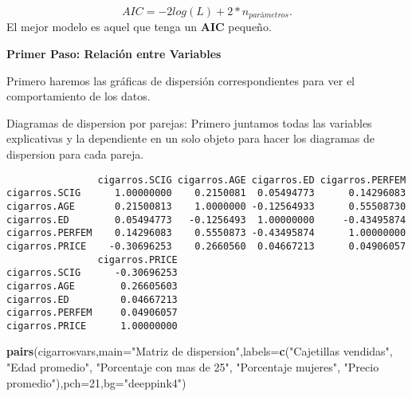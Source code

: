 \documentclass[
  a4paper,
  oneside,
  openany]{book}
\newenvironment{Shaded}{\begin{snugshade}}{\end{snugshade}}
\newcommand{\AttributeTok}[1]{\textcolor[rgb]{0.13,0.29,0.53}{#1}}
\newcommand{\DecValTok}[1]{\textcolor[rgb]{0.00,0.00,0.81}{#1}}
\newcommand{\FunctionTok}[1]{\textcolor[rgb]{0.13,0.29,0.53}{\textbf{#1}}}
\newcommand{\NormalTok}[1]{#1}
\newcommand{\OtherTok}[1]{\textcolor[rgb]{0.56,0.35,0.01}{#1}}
\newcommand{\SpecialCharTok}[1]{\textcolor[rgb]{0.81,0.36,0.00}{\textbf{#1}}}
\newcommand{\StringTok}[1]{\textcolor[rgb]{0.31,0.60,0.02}{#1}}
\begin{document}
\[AIC=-2log(L) +2* n_{parámetros}.\]
El mejor modelo es aquel que tenga un \(\textbf{AIC}\) pequeño.

\textbf{Primer Paso: Relación entre Variables}

Primero haremos las gráficas de dispersión correspondientes para ver el comportamiento de los datos.

Diagramas de dispersion por parejas: Primero juntamos todas las variables explicativas y la dependiente en un solo objeto para hacer los diagramas de dispersion para cada pareja.

\begin{Shaded}
\end{Shaded}

\begin{verbatim}
                cigarros.SCIG cigarros.AGE cigarros.ED cigarros.PERFEM
cigarros.SCIG      1.00000000    0.2150081  0.05494773      0.14296083
cigarros.AGE       0.21500813    1.0000000 -0.12564933      0.55508730
cigarros.ED        0.05494773   -0.1256493  1.00000000     -0.43495874
cigarros.PERFEM    0.14296083    0.5550873 -0.43495874      1.00000000
cigarros.PRICE    -0.30696253    0.2660560  0.04667213      0.04906057
                cigarros.PRICE
cigarros.SCIG      -0.30696253
cigarros.AGE        0.26605603
cigarros.ED         0.04667213
cigarros.PERFEM     0.04906057
cigarros.PRICE      1.00000000
\end{verbatim}

\begin{Shaded}
\begin{Highlighting}[]
\FunctionTok{pairs}\NormalTok{(cigarrosvars,}\AttributeTok{main=}\StringTok{"Matriz de dispersion"}\NormalTok{,}\AttributeTok{labels=}\FunctionTok{c}\NormalTok{(}\StringTok{"Cajetillas vendidas"}\NormalTok{, }\StringTok{"Edad promedio"}\NormalTok{, }\StringTok{"Porcentaje con mas de 25"}\NormalTok{, }\StringTok{"Porcentaje mujeres"}\NormalTok{, }\StringTok{"Precio promedio"}\NormalTok{),}\AttributeTok{pch=}\DecValTok{21}\NormalTok{,}\AttributeTok{bg=}\StringTok{"deeppink4"}\NormalTok{)}
\end{Highlighting}
\end{Shaded}
\end{document}
